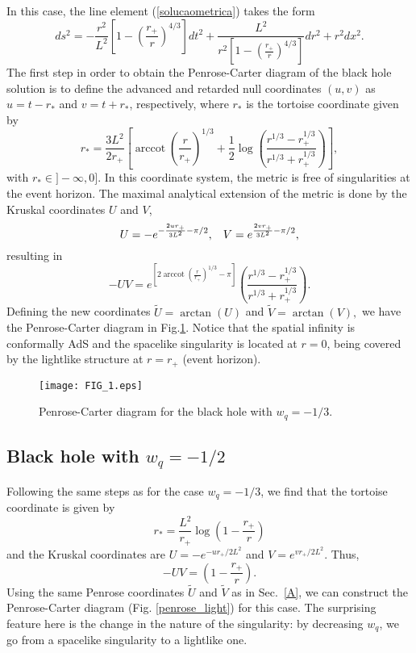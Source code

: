 \documentclass[preprint]{revtex4-1}
\DeclareMathOperator{\arccot}{arccot}
\begin{document}
In this case, the line element (\ref{solucaometrica}) takes the form
\[
 ds^{2}=-\frac{r^{2}}{L^{2}}\left[1-\left(\frac{r_{+}}{r}\right)^{4/3}\right]dt^{2}+\frac{L^2}{r^2\left[1-\left(\frac{r_{+}}{r}\right)^{4/3}\right]}dr^2+r^2dx^2.
 \]
 The first step in order to obtain the Penrose-Carter diagram of the black hole solution  is to define the advanced and retarded null coordinates $(u,v)$ as $u=t-r_{*}$ and $v=t+r_{*}$, respectively, where $r_{*}$ is the tortoise coordinate given by
\begin{equation}\label{tortoise_1}
r_{*}=\frac{3L^{2}}{2r_{+}}\left[\arccot\left(\frac{r}{r_{+}}\right)^{1/3}+\frac{1}{2}\log{\left(\frac{r^{1/3}-r_{+}^{1/3}}{r^{1/3}+r_{+}^{1/3}}\right)}\right],
\end{equation}
with $r_{*}\in ]-\infty,0]$. In this coordinate system, the metric is free of singularities at the event horizon. The maximal analytical extension of the metric is done by the Kruskal coordinates $U$ and $V$,
\begin{equation}\label{kruskal_1}
U=-e^{-\frac{2ur_{+}}{3L^2}-\pi/2}, \hspace{0.3cm} V=e^{\frac{2vr_{+}}{3L^2}-\pi/2},
\end{equation}
resulting in
\begin{equation}\label{uv_1}
-UV=e^{\left[2\arccot{\left(\frac{r}{r_{+}}\right)^{1/3}}-\pi\right]}\left(\frac{r^{1/3}-r_{+}^{1/3}}{r^{1/3}+r_{+}^{1/3}}\right).
\end{equation}
Defining the new coordinates $\tilde{U}=\arctan(U)$ and $\tilde{V}=\arctan(V),$ we have the Penrose-Carter diagram in Fig.\ref{penrose_1_3}. Notice that the spatial infinity is conformally AdS and the spacelike  singularity is located at $r=0$, being covered by the lightlike structure at $r=r_{+}$ (event horizon).
\begin{figure}[htp!]
\begin{center}
\texttt{[image: FIG\_1.eps]}
\end{center}
\caption{Penrose-Carter diagram for the black hole with $w_{q}=-1/3$.} \label{penrose_1_3}
\end{figure}

\subsection{Black hole with $w_{q}=-1/2$}

Following the same steps as for the case $w_{q}=-1/3$, we find that the tortoise coordinate is given by
\begin{equation}\label{tortoise_2}
r_{*}=\frac{L^2}{r_{+}}\log{\left(1-\frac{r_+}{r}\right)}
\end{equation}
and the Kruskal coordinates are $U=-e^{-ur_{+}/2L^{2}}$ and $V=e^{vr_{+}/2L^{2}}$. Thus,
\[
-UV=\left(1-\frac{r_{+}}{r}\right).
\]
 Using the same Penrose coordinates $\tilde{U}$ and $\tilde{V}$ as in Sec.~\ref{A}, we can construct the Penrose-Carter diagram (Fig. \ref{penrose_light}) for this case. The surprising feature here is the change in the nature of the singularity: by decreasing $w_q$, we go from a spacelike singularity to a lightlike one.
\end{document}
